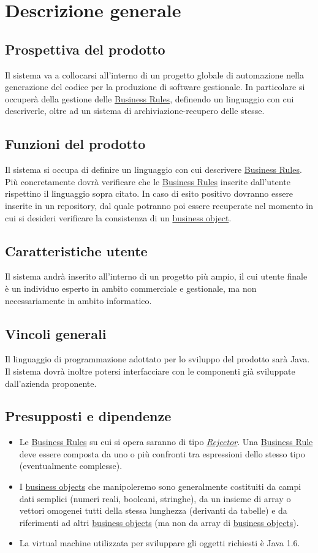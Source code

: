 \chapter{Descrizione generale}
\section{Prospettiva del prodotto}
Il sistema va a collocarsi all'interno di un progetto globale di automazione nella generazione del codice per la produzione di software gestionale. In particolare si occuper\`a della gestione delle \underline{Business Rules}, definendo un linguaggio con cui descriverle, oltre ad un sistema di archiviazione-recupero delle stesse.
\section{Funzioni del prodotto}
Il sistema si occupa di definire un linguaggio con cui descrivere \underline{Business Rules}. Pi\`u concretamente dovr\`a verificare che le \underline{Business Rules} inserite dall'utente rispettino il linguaggio sopra citato. In caso di esito positivo dovranno essere inserite in un repository, dal quale potranno poi essere recuperate nel momento in cui si desideri verificare la consistenza di un \underline{business object}.
\section{Caratteristiche utente}
Il sistema andr\`a inserito all'interno di un progetto pi\`u ampio, il cui utente finale \`e un individuo esperto in ambito commerciale e gestionale, ma non necessariamente in ambito informatico.
\section{Vincoli generali}
Il linguaggio di programmazione adottato per lo sviluppo del prodotto sar\`a Java. Il sistema dovr\`a inoltre potersi interfacciare con le componenti gi\`a sviluppate dall'azienda proponente. 
\section{Presupposti e dipendenze}
\begin{itemize}
\item{Le \underline{Business Rules} su cui si opera saranno di tipo \textit{\underline{Rejector}}. Una \underline{Business Rule} deve essere composta da uno o pi\`u confronti tra espressioni dello stesso tipo (eventualmente complesse).}
\item{I \underline{business objects} che manipoleremo sono generalmente costituiti da campi dati semplici (numeri reali, booleani, stringhe), da un insieme di array o vettori omogenei tutti della stessa lunghezza (derivanti da tabelle) e da riferimenti ad altri \underline{business objects} (ma non da array di \underline{business objects}).
}
\item{La virtual machine utilizzata  per sviluppare gli oggetti richiesti \`e Java 1.6.}
\end{itemize}

